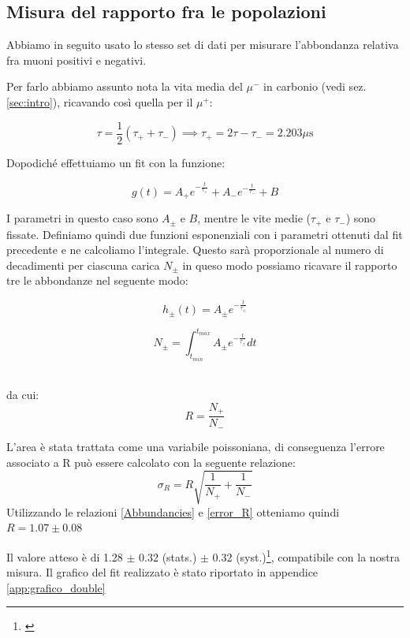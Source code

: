\documentclass[10pt,a4paper]{article}
\begin{document}
\subsection{Misura del rapporto fra le popolazioni}\label{subsec:rapporto}
\begin{flushleft}
Abbiamo in seguito usato lo stesso set di dati per misurare l'abbondanza relativa fra muoni positivi e negativi. 

Per farlo abbiamo assunto nota la vita media del $\mu^{-}$ in carbonio (vedi sez.\ref{sec:intro}), ricavando così quella per il $\mu^{+}$: 

\begin{equation}
    \label{mean_life_tot}
    \tau = \frac{1}{2}(\tau_{+}+\tau_{-}) \implies \tau_{+} = 2\tau -\tau_{-}= 2.203 \mu \text{s}
\end{equation}

Dopodiché effettuiamo un fit con la funzione:

\begin{equation}
    \label{fit_func_2}
    g(t) = A_{+}e^{-\frac{t}{\tau_+}}+A_{-}e^{-\frac{t}{\tau_-}} + B
\end{equation}

I parametri in questo caso sono $A_{\pm}$ e $B$, mentre le vite medie ($\tau_+$ e $\tau_-$) sono fissate. Definiamo quindi due funzioni esponenziali con i parametri ottenuti dal fit precedente e ne calcoliamo l'integrale. Questo sarà proporzionale al numero di decadimenti per ciascuna carica $N_{\pm}$ in queso modo possiamo ricavare il rapporto tre le abbondanze nel seguente modo:\\
\begin{minipage}{0.45\linewidth}
\centering
\begin{equation}
    \label{height_muon}
    h_{\pm}(t) = A_{\pm}e^{-\frac{t}{\tau_{\pm}}}
\end{equation}
\end{minipage}
\hfill
\begin{minipage}{0.45\linewidth}
\centering
\begin{equation}
    \label{Number_muon}
    N_{\pm} =\int _{t_{min}}^{t_{max}}  A_{\pm}e^{-\frac{t}{\tau_{\pm}}} dt
\end{equation}
\end{minipage}\\
da cui:
\begin{equation}
    \label{Abbundancies}
    R = \frac{N_+}{N_-}
\end{equation}


L'area è stata trattata come una variabile poissoniana, di conseguenza l'errore associato a R può essere calcolato con la seguente relazione:
\begin{equation}
    \label{error_R}
    \sigma_R = R\sqrt{\frac{1}{N_+}+\frac{1}{N_-}}
\end{equation}
Utilizzando le relazioni \ref{Abbundancies} e \ref{error_R} otteniamo quindi $R = 1.07 \pm 0.08$

Il valore atteso è di 1.28 $\pm$ 0.32 (stats.) $\pm$ 0.32 (syst.)\footnote{\cite{CMSChargeRatio2010}}, compatibile con la nostra misura.
Il grafico del fit realizzato è stato riportato in appendice \ref{app:grafico_double}

\end{flushleft}
\end{document}
